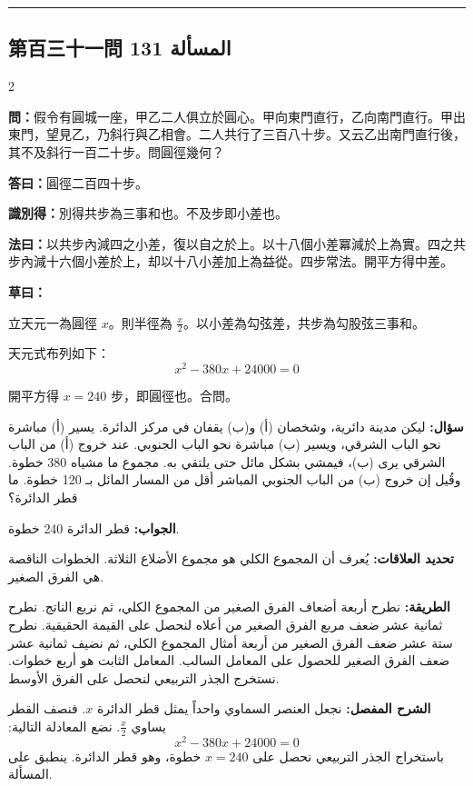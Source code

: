 \documentclass[11pt,a4paper]{article}
\newcommand{\ar}[1]{\arabicfont\beginR #1\endR}
\newcommand{\arb}[1]{\textbf{\arabicfont\beginR #1\endR}}
\newcommand{\longline}{\noindent\rule{\textwidth}{0.4pt}}
\newcommand{\arnote}[1]{\textcolor{arabicblue}{\ar{#1}}}
\newcommand{\wen}[1]{\par\noindent\textbf{\textcolor{probcolor}{問：}}{#1}\par}
\newcommand{\da}[1]{\par\noindent\textbf{\textcolor{anscolor}{答曰：}}{#1}\par}
\newcommand{\fayue}[1]{\par\noindent\textbf{\textcolor{methodcolor}{法曰：}}{#1}\par}
\newcommand{\caoyue}[1]{\par\noindent\textbf{草曰：}{#1}\par}
\newcommand{\zhi}[1]{\par\noindent\textbf{識別得：}{#1}\par}
\newcommand{\arwen}[1]{\par\noindent\arb{سؤال: }\arnote{#1}\par}
\newcommand{\arjwb}[1]{\par\noindent\arb{الجواب: }\arnote{#1}\par}
\newcommand{\arqwd}[1]{\par\noindent\arb{الطريقة: }\arnote{#1}\par}
\newcommand{\arshr}[1]{\par\noindent\arb{الشرح المفصل: }\arnote{#1}\par}
\newcommand{\arfl}[1]{\par\noindent\arb{تحديد العلاقات: }\arnote{#1}\par}
\begin{document}
\vspace{0.3cm}
\longline

\subsection*{第百三十一問 \hfill \ar{المسألة 131}}

\begin{paracol}{2}

\begin{leftcolumn}
\wen{假令有圓城一座，甲乙二人俱立於圓心。甲向東門直行，乙向南門直行。甲出東門，望見乙，乃斜行與乙相會。二人共行了三百八十步。又云乙出南門直行後，其不及斜行一百二十步。問圓徑幾何？}

\da{圓徑二百四十步。}

\zhi{別得共步為三事和也。不及步即小差也。}

\fayue{以共步內減四之小差，復以自之於上。以十八個小差冪減於上為實。四之共步內減十六個小差於上，却以十八小差加上為益從。四步常法。開平方得中差。}

\caoyue{
立天元一為圓徑 $x$。則半徑為 $\frac{x}{2}$。以小差為勾弦差，共步為勾股弦三事和。

天元式布列如下：
$$x^2 - 380x + 24000 = 0$$

開平方得 $x = 240$ 步，即圓徑也。合問。}
\end{leftcolumn}

\begin{rightcolumn}
\arwen{ليكن مدينة دائرية، وشخصان (أ) و(ب) يقفان في مركز الدائرة. يسير (أ) مباشرة نحو الباب الشرقي، ويسير (ب) مباشرة نحو الباب الجنوبي. عند خروج (أ) من الباب الشرقي يرى (ب)، فيمشي بشكل مائل حتى يلتقي به. مجموع ما مشياه 380 خطوة. وقُيل إن خروج (ب) من الباب الجنوبي المباشر أقل من المسار المائل بـ 120 خطوة. ما قطر الدائرة؟}

\arjwb{قطر الدائرة 240 خطوة.}

\arfl{يُعرف أن المجموع الكلي هو مجموع الأضلاع الثلاثة. الخطوات الناقصة هي الفرق الصغير.}

\arqwd{نطرح أربعة أضعاف الفرق الصغير من المجموع الكلي، ثم نربع الناتج. نطرح ثمانية عشر ضعف مربع الفرق الصغير من أعلاه لنحصل على القيمة الحقيقية. نطرح ستة عشر ضعف الفرق الصغير من أربعة أمثال المجموع الكلي، ثم نضيف ثمانية عشر ضعف الفرق الصغير للحصول على المعامل السالب. المعامل الثابت هو أربع خطوات. نستخرج الجذر التربيعي لنحصل على الفرق الأوسط.}

\arshr{نجعل العنصر السماوي واحداً يمثل قطر الدائرة $x$. فنصف القطر يساوي $\frac{x}{2}$. نضع المعادلة التالية:
$$x^2 - 380x + 24000 = 0$$
باستخراج الجذر التربيعي نحصل على $x = 240$ خطوة، وهو قطر الدائرة. ينطبق على المسألة.}
\end{rightcolumn}

\end{paracol}
\end{document}

